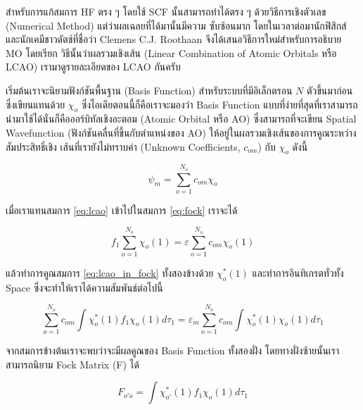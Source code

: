 สำหรับการแก้สมการ HF ตรง ๆ โดยใช้ SCF นั้นสามารถทำได้ตรง ๆ ด้วยวิธีการเชิงตัวเลข (Numerical Method) แต่ว่าผลเฉลยที่ได้มานั้นมีความ%
ซับซ้อนมาก โดยในเวลาต่อมานักฟิสิกส์และนักเคมีชาวดัตช์ที่ชื่อว่า Clemens C.J. Roothaan จึงได้เสนอวิธีการใหม่สำหรับการอธิบาย MO โดยเรียก%
วิธีนั้นว่าผลรวมเชิงเส้น (Linear Combination of Atomic Orbitals หรือ LCAO)\autocite{atkins2010} เรามาดูรายละเอียดของ LCAO 
กันครับ 

เริ่มต้นเราจะนิยามฟังก์ชันพื้นฐาน (Basis Function) สำหรับระบบที่มีอิเล็กตรอน $N$ ตัวขึ้นมาก่อน ซึ่งเขียนแทนด้วย $\chi_{o}$
ซึ่งไอเดียตอนนี้ก็คือเราจะมองว่า Basis Function แบบที่ง่ายที่สุดที่เราสามารถนำมาใช้ได้นั่นก็คือออร์บิทัลเชิงอะตอม (Atomic Orbital หรือ AO) 
ซึ่งสามารถที่จะเขียน Spatial Wavefunction (ฟังก์ชันคลื่นที่ขึ้นกับตำแหน่งของ AO) ให้อยู่ในผลรวมเชิงเส้นของการคูณระหว่างสัมประสิทธิ์เชิง%
เส้นที่เรายังไม่ทราบค่า (Unknown Coefficients, $c_{om}$) กับ $\chi_{o}$ ดังนี้

\begin{equation}\label{eq:lcao}
    \psi_{m} = \sum^{N_{o}}_{o=1} c_{om} \chi_{o} 
\end{equation}

\noindent เมื่อเราแทนสมการ \ref{eq:lcao} เข้าไปในสมการ \ref{eq:fock} เราจะได้

\begin{equation}\label{eq:lcao_in_fock}
    f_{1} \sum^{N_{o}}_{o=1} \chi_{o}(1) = \varepsilon \sum^{N_{o}}_{o=1} c_{om} \chi_{o}(1)
\end{equation}

\noindent แล้วทำการคูณสมการ \ref{eq:lcao_in_fock} ทั้งสองข้างด้วย $\chi^{*}_{o}(1)$ และทำการอินทิเกรตทั่วทั้ง Space 
ซึ่งจะทำให้เราได้ความสัมพันธ์ต่อไปนี้

\begin{equation}\label{eq:lcao_in_fock_int}
    \sum^{N_{o}}_{o=1} c_{om} \int \chi^{*}_{o}(1) f_{1} \chi_{o}(1) d\tau_{1} =
    \varepsilon_{m} \sum^{N_{o}}_{o=1} c_{om} \int \chi^{*}_{o}(1) \chi_{o}(1) d\tau_{1}
\end{equation}

\noindent จากสมการข้างต้นเราจะพบว่าจะมีผลคูณของ Basis Function ทั้งสองฝั่ง โดยทางฝั่งซ้ายนั้นเราสามารถนิยาม Fock Matrix (F) ได้

\begin{equation}\label{eq:matrix_fock}
    F_{o'o} = \int \chi^{*}_{o'}(1) f_{1} \chi_{o}(1) d\tau_{1}
\end{equation}

